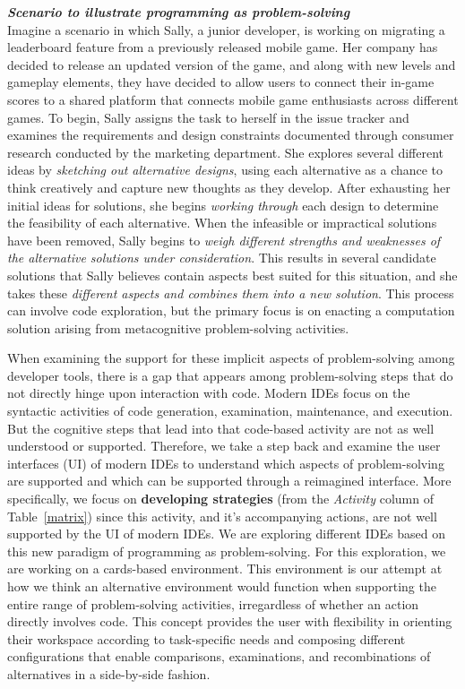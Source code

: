 \documentclass{ppig}
\newcommand{\bold}[1]{\textit{\textbf{\color{aoblue}#1}}}
\begin{document}
\bold{Scenario to illustrate programming as problem-solving\\}
Imagine a scenario in which Sally, a junior developer, is working on migrating a leaderboard feature from a previously released mobile game.
Her company has decided to release an updated version of the game, and along with new levels and gameplay elements, they have decided to allow users to connect their in-game scores to a shared platform that connects mobile game enthusiasts across different games.
To begin, Sally assigns the task to herself in the issue tracker and examines the requirements and design constraints documented through consumer research conducted by the marketing department.
She explores several different ideas by \textit{sketching out alternative designs}, using each alternative as a chance to think creatively and capture new thoughts as they develop.
After exhausting her initial ideas for solutions, she begins \textit{working through} each design to determine the feasibility of each alternative.
When the infeasible or impractical solutions have been removed, Sally begins to \textit{weigh different strengths and weaknesses of the alternative solutions under consideration}.
This results in several candidate solutions that Sally believes contain aspects best suited for this situation, and she takes these \textit{different aspects and combines them into a new solution}.
This process can involve code exploration, but the primary focus is on enacting a computation solution arising from metacognitive problem-solving activities.

When examining the support for these implicit aspects of problem-solving among developer tools, there is a gap that appears among problem-solving steps that do not directly hinge upon interaction with code.
Modern IDEs focus on the syntactic activities of code generation, examination, maintenance, and execution.
But the cognitive steps that lead into that code-based activity are not as well understood or supported.
Therefore, we take a step back and examine the user interfaces (UI) of modern IDEs to understand which aspects of problem-solving are supported and which can be supported through a reimagined interface.
More specifically, we focus on \textbf{developing strategies} (from the \textit{Activity} column of Table~\ref{matrix}) since this activity, and it's accompanying actions, are not well supported by the UI of modern IDEs.
We are exploring different IDEs based on this new paradigm of programming as problem-solving.
For this exploration, we are working on a cards-based environment.
This environment is our attempt at how we think an alternative environment would function when supporting the entire range of problem-solving activities, irregardless of whether an action directly involves code.
This concept provides the user with flexibility in orienting their workspace according to task-specific needs and composing different configurations that enable comparisons, examinations, and recombinations of alternatives in a side-by-side fashion.
\end{document}
